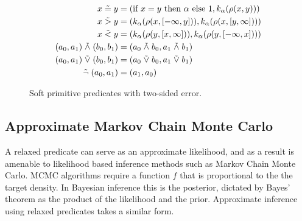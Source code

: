 

\begin{figure}\label{softw}
\begin{align*}
x \mathrel{\tilde{=}} y &= (\text{if } x = y  \text{ then } \alpha \text{ else } 1, k_\alpha(\rho(x, y)))\\
x \mathrel{\tilde{>}} y &= (k_\alpha(\rho(x, [-\infty, y])), k_\alpha(\rho(x, [y, \infty])))\\
x \mathrel{\tilde{<}} y &= (k_\alpha(\rho(y, [x, \infty])), k_\alpha(\rho(y, [-\infty, x])))\\
(a_0, a_1) \mathrel{\tilde{\land}} (b_0, b_1) &= (a_0 \mathrel{\tilde{\land}} b_0, a_1 \mathrel{\tilde{\land}} b_1)\\
(a_0, a_1) \mathrel{\tilde{\lor}} (b_0, b_1) &= (a_0 \mathrel{\tilde{\lor}} b_0, a_1 \mathrel{\tilde{\lor}} b_1)\\
\mathrel{\tilde{\neg}}(a_0, a_1) &= (a_1, a_0)
\end{align*}
\caption{Soft primitive predicates with two-sided error.}
\end{figure}




\subsection{Approximate Markov Chain Monte Carlo}
A relaxed predicate can serve as an approximate likelihood, and as a result is amenable to likelihood based inference methods such as Markov Chain Monte Carlo.
MCMC algorithms require a function $f$ that is proportional to the the target density.
In Bayesian inference this is the posterior, dictated by Bayes' theorem as the product of the likelihood and the prior.
Approximate inference using relaxed predicates takes a similar form.

